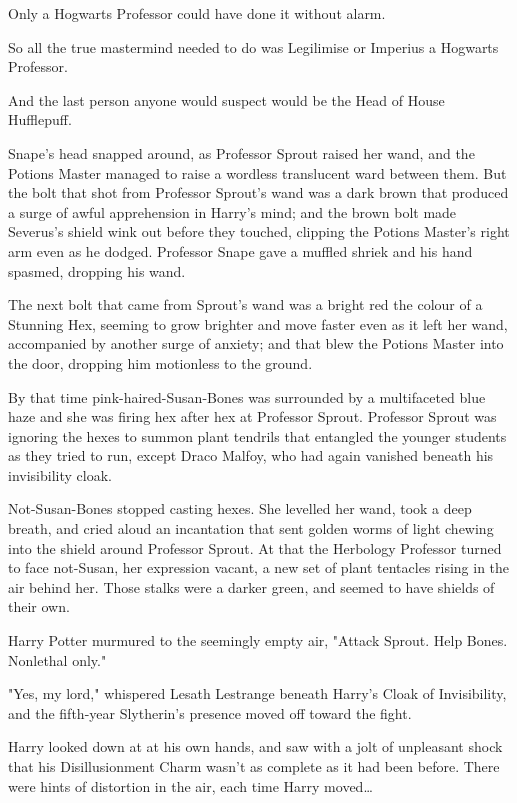 Only a Hogwarts Professor could have done it without alarm.

So all the true mastermind needed to do was Legilimise or Imperius a Hogwarts
Professor.

And the last person anyone would suspect would be the Head of House Hufflepuff.

Snape's head snapped around, as Professor Sprout raised her wand, and the
Potions Master managed to raise a wordless translucent ward between them. But
the bolt that shot from Professor Sprout's wand was a dark brown that produced
a surge of awful apprehension in Harry's mind; and the brown bolt made
Severus's shield wink out before they touched, clipping the Potions Master's
right arm even as he dodged. Professor Snape gave a muffled shriek and his hand
spasmed, dropping his wand.

The next bolt that came from Sprout's wand was a bright red the colour of a
Stunning Hex, seeming to grow brighter and move faster even as it left her
wand, accompanied by another surge of anxiety; and that blew the Potions Master
into the door, dropping him motionless to the ground.

By that time pink-haired-Susan-Bones was surrounded by a multifaceted blue haze
and she was firing hex after hex at Professor Sprout. Professor Sprout was
ignoring the hexes to summon plant tendrils that entangled the younger students
as they tried to run, except Draco Malfoy, who had again vanished beneath his
invisibility cloak.

Not-Susan-Bones stopped casting hexes. She levelled her wand, took a deep
breath, and cried aloud an incantation that sent golden worms of light chewing
into the shield around Professor Sprout. At that the Herbology Professor turned
to face not-Susan, her expression vacant, a new set of plant tentacles rising
in the air behind her. Those stalks were a darker green, and seemed to have
shields of their own.

Harry Potter murmured to the seemingly empty air, "Attack Sprout. Help Bones.
Nonlethal only."

"Yes, my lord," whispered Lesath Lestrange beneath Harry's Cloak of
Invisibility, and the fifth-year Slytherin's presence moved off toward the
fight.

Harry looked down at at his own hands, and saw with a jolt of unpleasant shock
that his Disillusionment Charm wasn't as complete as it had been before. There
were hints of distortion in the air, each time Harry moved…

